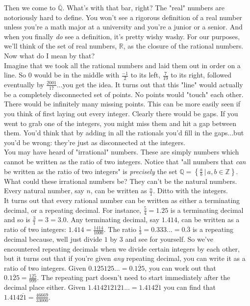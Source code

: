 \documentclass[11pt,letterpaper]{article}
\begin{document}
\noindent Then we come to $\overline{\mathbb{Q}}$. What's with that bar, right? The "real" numbers are notoriously hard to define. You won't see a rigorous definition of a real number unless you're a math major at a university and you're a junior or a senior. And when you finally \textit{do} see a definition, it's pretty wishy washy. For our purposes, we'll think of the set of real numbers, $\mathbb{R}$, as the closure of the rational numbers. Now what do I mean by that? \\

\noindent Imagine that we took all the rational numbers and laid them out in order on a line. So $0$ would be in the middle with $\frac{-1}{2}$ to its left, $\frac{7}{19}$ to its right, followed eventually by $\frac{2001}{17}$...you get the idea. It turns out that this "line" would actually be a completely disconnected set of points. No points would "touch" each other. There would be infinitely many missing points. This can be more easily seen if you think of first laying out every integer. Clearly there would be gaps. If you went to grab one of the integers, you might miss them and hit a gap between them. You'd think that by adding in all the rationals you'd fill in the gaps...but you'd be wrong: they're just as disconnected at the integers. \\

\noindent You may have heard of "irrational" numbers. These are simply numbers which cannot be written as the ratio of two integers. Notice that "all numbers that \textit{can} be written as the ratio of two integers" is \textit{precisely} the set $\mathbb{Q} = \left\{\frac{a}{b} \, | \, a,b\in \mathbb{Z}\right\} $. What could these irrational numbers be? They can't be the natural numbers. Every natural number, say $n$, can be written as $\frac{n}{1}$. Ditto with the integers. \\

\noindent It turns out that every rational number can be written as either a terminating decimal, or a repeating decimal. For instance, $\frac{5}{4} = 1.25$ is a terminating decimal and so is $\frac{3}{1} = 3 = 3.0$. Any terminating decimal, say $1.414$, can be written as a ratio of two integers: $1.414 = \frac{1414}{1000}$. The ratio $\frac{1}{3} = 0.333... = 0.\overline{3}$ is a repeating decimal because, well just divide $1$ by $3$ and see for yourself. So we've encountered repeating decimals when we divide certain integers by each other, but it turns out that if you're given \textit{any} repeating decimal, you can write it as a ratio of two integers. Given $0.125125... = 0.\overline{125}$, you can work out that $0.\overline{125} = \frac{125}{999}$. The repeating part doesn't need to start immediately after the decimal place either. Given $1.414212121... = 1.414\overline{21}$ you can find that $1.414\overline{21} = \frac{46669}{33000}$. \\
\end{document}
